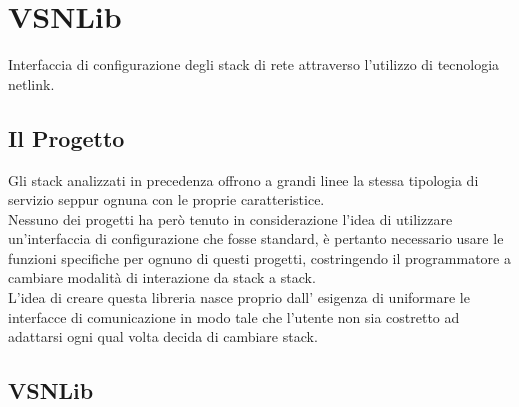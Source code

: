 

\chapter{VSNLib}                %
\lhead[\fancyplain{}{\bfseries\thepage}]{\fancyplain{}{\bfseries\rightmark}}
Interfaccia di configurazione degli stack di rete attraverso l'utilizzo di tecnologia netlink.
\section{Il Progetto}                 %
Gli stack analizzati in precedenza offrono a grandi linee la stessa tipologia di servizio seppur ognuna con le proprie caratteristice.\\
Nessuno dei progetti ha per\`o tenuto in considerazione l'idea di utilizzare un'interfaccia di configurazione che fosse standard, \`e pertanto necessario usare le funzioni specifiche per ognuno di questi progetti, costringendo il programmatore a cambiare modalit\`a di interazione da stack a stack.\\
L'idea di creare questa libreria nasce proprio dall' esigenza di uniformare le interfacce di comunicazione in modo tale che l'utente non sia costretto ad adattarsi ogni qual volta decida di cambiare stack.\\
\section{VSNLib}
